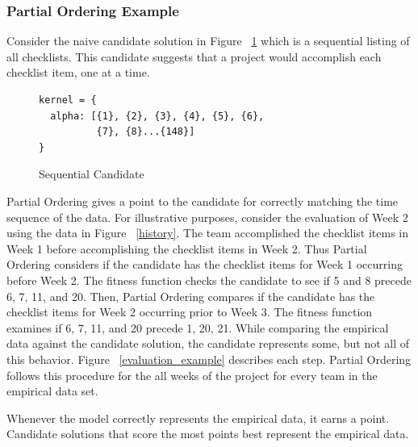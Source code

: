 \documentclass[conference]{IEEEtran}
\begin{document}

\subsubsection{Partial Ordering Example}

Consider the naive candidate solution in Figure ~\ref{sequential_candidate} which is a sequential listing of all checklists. This candidate suggests that a project would accomplish each checklist item, one at a time.

\begin{figure}[!htb]
\begin{verbatim}
kernel = {
  alpha: [{1}, {2}, {3}, {4}, {5}, {6}, 
          {7}, {8}...{148}]
}
\end{verbatim}
 \caption{Sequential Candidate}
 \label{sequential_candidate}
\end{figure}

Partial Ordering gives a point to the candidate for correctly matching the time sequence of the data. For illustrative purposes, consider the evaluation of Week 2 using the data in Figure ~\ref{history}. The team accomplished the checklist items in Week 1 before accomplishing the checklist items in Week 2. Thus Partial Ordering considers if the candidate has the checklist items for Week 1 occurring before Week 2. The fitness function checks the candidate to see if 5 and 8 precede 6, 7, 11, and 20. Then, Partial Ordering compares if the candidate has the checklist items for Week 2 occurring prior to Week 3. The fitness function examines if 6, 7, 11, and 20 precede 1, 20, 21. While comparing the empirical data against the candidate solution, the candidate represents some, but not all of this behavior. Figure ~\ref{evaluation_example} describes each step. Partial Ordering follows this procedure for the all weeks of the project for every team in the empirical data set.

Whenever the model correctly represents the empirical data, it earns a point. Candidate solutions that score the most points best represent the empirical data.
\end{document}
